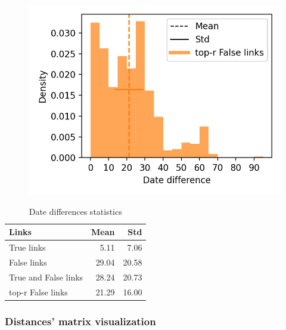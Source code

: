 \begin{figure}
  \label{fig:dates_differences_r_false}
  \includegraphics[width=\linewidth]{img/dates_differences_r_false.png}
\end{figure}

\begin{table}
  \centering
  \caption{Date differences statistics}
  \label{tab:date_differences}
    \begin{tabular}{l r r}
      \toprule
      Links                & Mean  & Std   \\
      \midrule
      True links           &  5.11 &  7.06 \\
      False links          & 29.04 & 20.58 \\
      True and False links & 28.24 & 20.73 \\
      top-r False links    & 21.29 & 16.00 \\
      \bottomrule
    \end{tabular}
\end{table}

\subsubsection{Distances' matrix visualization}

